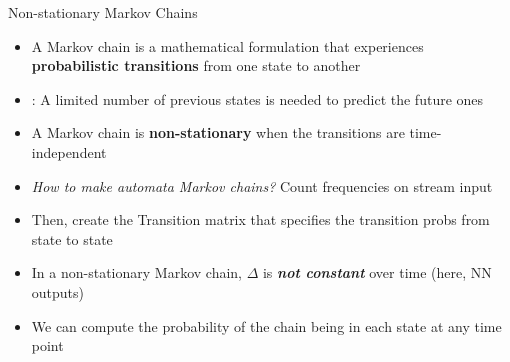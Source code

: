 \documentclass[10pt, aspectratio=169]{beamer}
\begin{document}
\begin{frame}{Non-stationary Markov Chains}
    \begin{itemize}
        \setlength{\itemsep}{12pt}
         \item A \textcolor{umBlueLighter}{Markov chain} is a mathematical formulation that experiences \textbf{ probabilistic transitions} from one state to another
         \item {}: A limited number of previous states is needed to predict the future ones
         \item A Markov chain is \textbf{non-stationary} when the transitions are time-independent
        \item \textit{How to make automata Markov chains?} Count frequencies on stream input
        \item Then, create the \textcolor{umBlueLighter}{Transition matrix} that specifies the transition probs from state to state
        \item In a non-stationary Markov chain, $\Delta$ is \textbf{\textit{not constant}} over time (here, NN outputs)
        \item We can compute the probability of the chain being in each state at any time point
     \end{itemize}

\end{frame}
\end{document}

